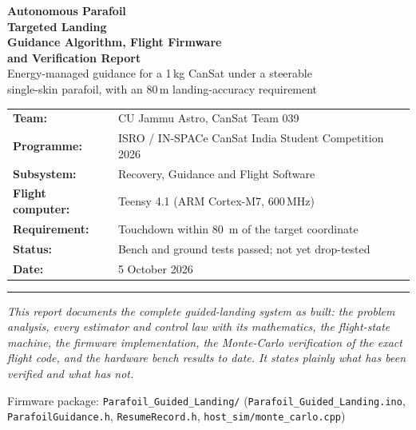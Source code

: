 \documentclass[11pt,a4paper]{article}
\newcommand{\code}[1]{\texttt{#1}}
\begin{document}
\begin{titlepage}
\centering
\vspace*{1.2cm}
{\Huge\bfseries\color{isrogreen} Autonomous Parafoil}\\[0.3cm]
{\Huge\bfseries\color{isrogreen} Targeted Landing}\\[0.6cm]
{\LARGE\bfseries\color{isroorange} Guidance Algorithm, Flight Firmware\\[0.15cm] and Verification Report}\\[1.4cm]

{\large Energy-managed guidance for a 1\,kg CanSat under a steerable\\
single-skin parafoil, with an 80\,m landing-accuracy requirement}\\[1.6cm]

\begin{tabular}{ll}
\textbf{Team:} & CU Jammu Astro, CanSat Team 039 \\
\textbf{Programme:} & ISRO / IN-SPACe CanSat India Student Competition 2026 \\
\textbf{Subsystem:} & Recovery, Guidance and Flight Software \\
\textbf{Flight computer:} & Teensy 4.1 (ARM Cortex-M7, 600\,MHz) \\
\textbf{Requirement:} & Touchdown within \SI{80}{\meter} of the target coordinate \\
\textbf{Status:} & Bench and ground tests passed; not yet drop-tested \\
\textbf{Date:} & 5 October 2026 \\
\end{tabular}

\vspace{1.4cm}
\rule{0.6\textwidth}{0.4pt}

\vspace{0.5cm}
{\normalsize\itshape
This report documents the complete guided-landing system as built: the
problem analysis, every estimator and control law with its mathematics, the
flight-state machine, the firmware implementation, the Monte-Carlo
verification of the exact flight code, and the hardware bench results to
date. It states plainly what has been verified and what has not.}

\vfill
{\small Firmware package: \code{Parafoil\_Guided\_Landing/} \quad
(\code{Parafoil\_Guided\_Landing.ino}, \code{ParafoilGuidance.h},
\code{ResumeRecord.h}, \code{host\_sim/monte\_carlo.cpp})}
\end{titlepage}
\end{document}

